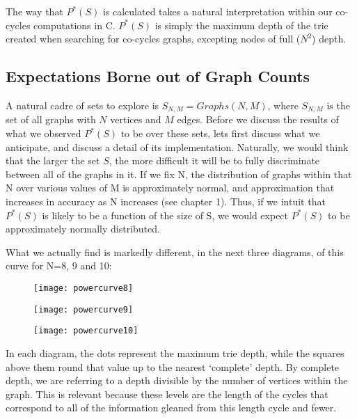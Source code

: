 The way that  $P^*(S)$ is calculated takes a natural interpretation within our co-cycles computations in C. 
 $P^*(S)$ is simply the maximum depth of the trie created when searching for co-cycles graphs, excepting nodes of full ($N^2$) depth.

\subsection{Expectations Borne out of Graph Counts}

A natural cadre of sets to explore is $S_{N, M} = Graphs(N, M)$, where $S_{N, M}$ is the set of all graphs with $N$ vertices and $M$ edges.
Before we discuss the results of what we observed $P^*(S)$ to be over these sets, lets first discuss what we anticipate, and discuss a detail of its implementation.
Naturally, we would think that the larger the set $S$, the more difficult it will be to fully discriminate between all of the graphs in it.
If we fix N, the distribution of graphs within that N over various values of M is approximately normal, and approximation that increases in accuracy as N increases (see chapter 1).
Thus, if we intuit that $P^*(S)$ is likely to be a function of the size of S, we would expect $P^*(S)$ to be approximately normally distributed.

What we actually find is markedly different, in the next three diagrams, of this curve for N=8, 9 and 10:

\begin{figure}[h]
\label{fig:powercurve8}
\caption{}
\centering
\texttt{[image: powercurve8]}
\end{figure}

\begin{figure}[h]
\label{fig:powercurve9}
\caption{}
\centering
\texttt{[image: powercurve9]}
\end{figure}

\begin{figure}[h]
\label{fig:powercurve10}
\caption{}
\centering
\texttt{[image: powercurve10]}
\end{figure}

In each diagram, the dots represent the maximum trie depth, while the squares above them round that value up to the nearest `complete' depth.
By complete depth, we are referring to a depth divisible by the number of vertices within the graph.
This is relevant because these levels are the length of the cycles that correspond to all of the information gleaned from this length cycle and fewer.

